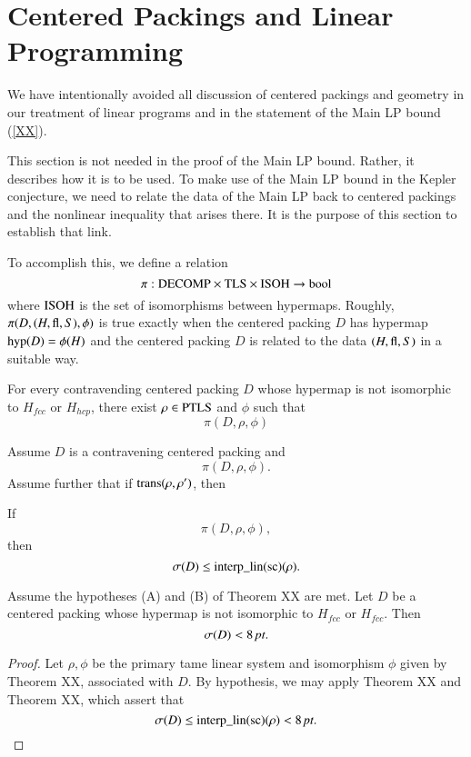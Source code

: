 \section{Centered Packings and Linear Programming}

We have intentionally avoided all discussion of centered packings
and geometry in our treatment of linear programs and in the
statement of the Main LP bound (\ref{XX}).

This section is not needed in the proof of the Main LP bound.
Rather, it describes how it is to be used.  To make use of the
Main LP bound in the Kepler conjecture, we need to relate the data
of the Main LP back to centered packings and the nonlinear
inequality that arises there.  It is the purpose of this section
to establish that link.

To accomplish this, we define a relation
    $$\pi:{\operatorname{DECOMP}}\times {\operatorname{TLS}}\times {\operatorname{ISOH}}
    \to\operatorname{bool}$$
where ${\operatorname{ISOH}}$ is the set of isomorphisms between hypermaps.
Roughly, $\pi(D,(H,{\operatorname{fl}},S),\phi)$ is true exactly when the
centered packing $D$ has hypermap ${\operatorname{hyp}}(D) =\phi(H)$ and the
centered packing $D$ is related to the data $(H,{\operatorname{fl}},S)$ in a
suitable way.

\begin{theorem}  For every contravending centered packing $D$
whose hypermap is not isomorphic to $H_{fcc}$ or $H_{hcp}$, there
exist $\rho\in{\operatorname{PTLS}}$ and $\phi$ such that
    $$\pi(D,\rho,\phi)$$
\end{theorem}

\begin{theorem}
Assume $D$ is a contravening centered packing and
    $$
    \pi(D,\rho,\phi).
    $$
Assume further that if ${\operatorname{trans}}(\rho,\rho')$, then

    If
    $$\pi(D,\rho,\phi),$$
    then
    $$\sigma(D) \le {\operatorname{interp\_lin}}({\operatorname{sc}})(\rho).$$
\end{theorem}

\begin{corollary}
Assume the hypotheses (A) and (B) of Theorem XX are met.  Let $D$
be a centered packing whose hypermap is not isomorphic to
$H_{fcc}$ or $H_{fcc}$.  Then
    $$\sigma(D) < 8\,\hbox{\it pt}.$$
\end{corollary}

\begin{proof}  Let $\rho,\phi$ be the
primary tame linear system and isomorphism $\phi$ given by Theorem
XX, associated with $D$. By hypothesis, we may apply Theorem XX
and Theorem XX, which assert that
    $$\sigma(D) \le {\operatorname{interp\_lin}}({\operatorname{sc}})(\rho) < 8\,\hbox{\it pt}.$$
\end{proof}

